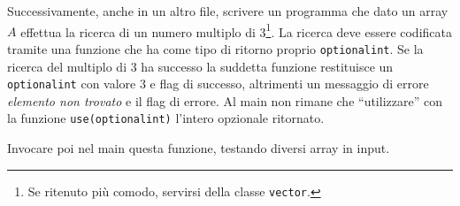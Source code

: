 \documentclass[addpoints,12pt,answers]{exam}
\begin{document}
    Successivamente, anche in un altro file, scrivere un programma che dato un array $A$ effettua la ricerca di un numero multiplo di 3\footnote{Se ritenuto più comodo, servirsi della classe \texttt{vector}.}. La ricerca deve essere codificata tramite una funzione che ha come tipo di ritorno proprio \texttt{optional\textunderscore int}. Se la ricerca del multiplo di 3 ha successo la suddetta funzione restituisce un \texttt{optional\textunderscore int} con valore 3 e flag di successo, altrimenti un messaggio di errore \emph{elemento non trovato} e il flag di errore. Al main non rimane che ``utilizzare'' con la funzione \texttt{use(optional\textunderscore int)} l'intero opzionale ritornato. 

    Invocare poi nel main questa funzione, testando diversi array in input.
    
\end{document}
